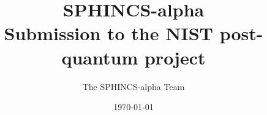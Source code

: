 \documentclass[sigconf,anonymous]{acmart}
\begin{document}
\fancyhead{}
\def\thetitle{SPHINCS-alpha \\ Submission to the NIST post-quantum project}
\title{\thetitle}
\date{\today}
\author{The SPHINCS-alpha Team}

\maketitle

\newpage

\tableofcontents

\newpage














\appendix

\end{document}
